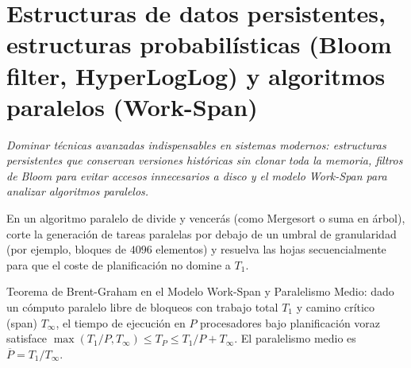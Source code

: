 \documentclass{book}
\begin{document}
\chapter{Estructuras de datos persistentes, estructuras probabilísticas (Bloom filter, HyperLogLog) y algoritmos paralelos (Work-Span)}
\label{chap:cap05-estructuras-persistentes-probabilisticas-paralelos}

\noindent\textit{Dominar técnicas avanzadas indispensables en sistemas modernos: estructuras persistentes que conservan versiones históricas sin clonar toda la memoria, filtros de Bloom para evitar accesos innecesarios a disco y el modelo Work-Span para analizar algoritmos paralelos.}

\begin{tcolorbox}[title={Consejo}, studiumtip, breakable]

En un algoritmo paralelo de divide y vencerás (como Mergesort o suma en árbol), corte la generación de tareas paralelas por debajo de un umbral de granularidad (por ejemplo, bloques de \(4096\) elementos) y resuelva las hojas secuencialmente para que el coste de planificación no domine a \(T_1\).
\end{tcolorbox}

\begin{tcolorbox}[title={Definición}, studiumdef, breakable]

Teorema de Brent-Graham en el Modelo Work-Span y Paralelismo Medio: dado un cómputo paralelo libre de bloqueos con trabajo total \(T_1\) y camino crítico (span) \(T_\infty\), el tiempo de ejecución en \(P\) procesadores bajo planificación voraz satisface \(\max(T_1 / P, T_\infty) \le T_P \le T_1 / P + T_\infty\). El paralelismo medio es \(\overline{P} = T_1 / T_\infty\).
\end{tcolorbox}
\end{document}
